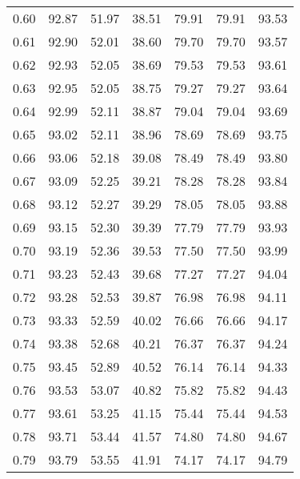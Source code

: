 \begin{tabular}{|c|c|c|c|c|c|c|}
      0.60 &     92.87 &     51.97 &      38.51 &   79.91 &      79.91 &         93.53 \\
      0.61 &     92.90 &     52.01 &      38.60 &   79.70 &      79.70 &         93.57 \\
      0.62 &     92.93 &     52.05 &      38.69 &   79.53 &      79.53 &         93.61 \\
      0.63 &     92.95 &     52.05 &      38.75 &   79.27 &      79.27 &         93.64 \\
      0.64 &     92.99 &     52.11 &      38.87 &   79.04 &      79.04 &         93.69 \\
      0.65 &     93.02 &     52.11 &      38.96 &   78.69 &      78.69 &         93.75 \\
      0.66 &     93.06 &     52.18 &      39.08 &   78.49 &      78.49 &         93.80 \\
      0.67 &     93.09 &     52.25 &      39.21 &   78.28 &      78.28 &         93.84 \\
      0.68 &     93.12 &     52.27 &      39.29 &   78.05 &      78.05 &         93.88 \\
      0.69 &     93.15 &     52.30 &      39.39 &   77.79 &      77.79 &         93.93 \\
      0.70 &     93.19 &     52.36 &      39.53 &   77.50 &      77.50 &         93.99 \\
      0.71 &     93.23 &     52.43 &      39.68 &   77.27 &      77.27 &         94.04 \\
      0.72 &     93.28 &     52.53 &      39.87 &   76.98 &      76.98 &         94.11 \\
      0.73 &     93.33 &     52.59 &      40.02 &   76.66 &      76.66 &         94.17 \\
      0.74 &     93.38 &     52.68 &      40.21 &   76.37 &      76.37 &         94.24 \\
      0.75 &     93.45 &     52.89 &      40.52 &   76.14 &      76.14 &         94.33 \\
      0.76 &     93.53 &     53.07 &      40.82 &   75.82 &      75.82 &         94.43 \\
      0.77 &     93.61 &     53.25 &      41.15 &   75.44 &      75.44 &         94.53 \\
      0.78 &     93.71 &     53.44 &      41.57 &   74.80 &      74.80 &         94.67 \\
      0.79 &     93.79 &     53.55 &      41.91 &   74.17 &      74.17 &         94.79 \\

\end{tabular}
